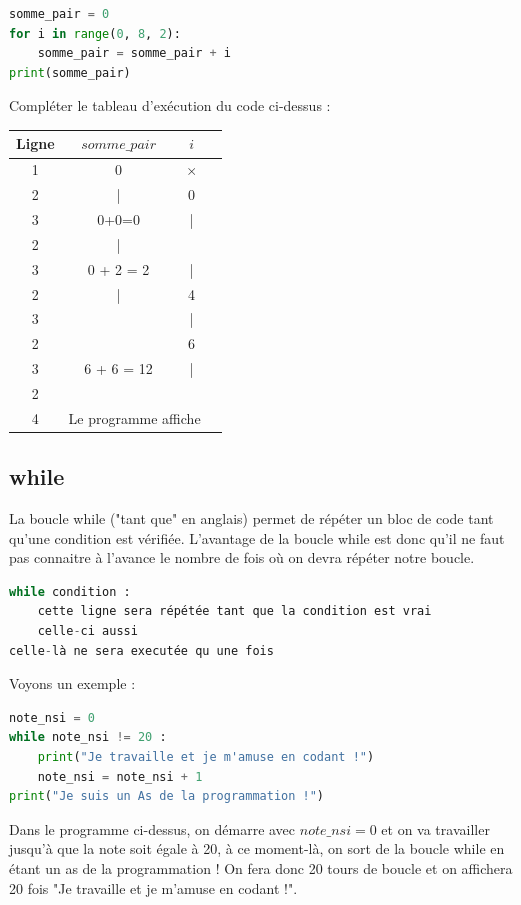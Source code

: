 \begin{Quizz}
    \begin{lstlisting}[style=pythonstyle, language=python]
somme_pair = 0
for i in range(0, 8, 2):
    somme_pair = somme_pair + i
print(somme_pair)
\end{lstlisting}
Compléter le tableau d'exécution du code ci-dessus :
\begin{center}
\begin{tabular}{c|c c   | l}
     {\color{blue}Ligne} & $somme\_pair$ & $i$ \\ \hline
     {\color{blue}1} & 0  & $\times$  \\
     {\color{blue}2} & | & 0   \\
     {\color{blue}3} & 0+0=0 & |  \\
     {\color{blue}2} & | &  & \\
     {\color{blue}3} & 0 + 2 = 2 & |  \\
     {\color{blue}2} & | & 4 \\
     {\color{blue}3} &  & | \\
     {\color{blue}2} &  & 6 \\
     {\color{blue}3} & 6 + 6 = 12 & | \\
     {\color{blue}2} &  &  \\
     {\color{blue}4} & \multicolumn{2}{r}{Le programme affiche } &\\
\end{tabular}
\end{center}
\end{Quizz}

\subsection{while}
La boucle while ("tant que" en anglais) permet de répéter un bloc de code  tant qu'une condition est vérifiée. L'avantage de la boucle while est donc qu'il ne faut pas connaitre à l'avance le nombre de fois où on devra répéter notre boucle.
\begin{lstlisting}[style=pythonstyle, language=python]
while condition :
    cette ligne sera répétée tant que la condition est vrai
    celle-ci aussi
celle-là ne sera executée qu une fois
\end{lstlisting}

Voyons un exemple :
\begin{lstlisting}[style=pythonstyle, language=python]
note_nsi = 0
while note_nsi != 20 :
    print("Je travaille et je m'amuse en codant !")
    note_nsi = note_nsi + 1
print("Je suis un As de la programmation !")
\end{lstlisting}
Dans le programme ci-dessus, on démarre avec $note\_nsi=0$ et on va travailler jusqu'à que la note soit égale à 20, à ce moment-là, on sort de la boucle while en étant un as de la programmation !
On fera donc 20 tours de boucle et on affichera 20 fois "Je travaille et je m'amuse en codant !".

